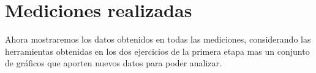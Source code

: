 \section{Mediciones realizadas}
Ahora mostraremos los datos obtenidos en todas las mediciones, considerando las herramientas obtenidas en los dos ejercicios de la primera etapa mas un conjunto de gráficos que aporten nuevos datos para poder analizar.
